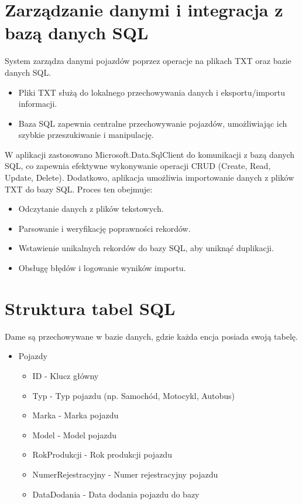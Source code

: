 \section{Zarządzanie danymi i integracja z bazą danych SQL}
System zarządza danymi pojazdów poprzez operacje na plikach TXT oraz bazie danych SQL.
\begin{itemize}
    \item Pliki TXT służą do lokalnego przechowywania danych i eksportu/importu informacji.
    \item Baza SQL zapewnia centralne przechowywanie pojazdów, umożliwiając ich szybkie przeszukiwanie i manipulację.
\end{itemize}
W aplikacji zastosowano Microsoft.Data.SqlClient do komunikacji z bazą danych SQL, co zapewnia efektywne wykonywanie operacji CRUD (Create, Read, Update, Delete).
Dodatkowo, aplikacja umożliwia importowanie danych z plików TXT do bazy SQL. Proces ten obejmuje:
\begin{itemize}
\item Odczytanie danych z plików tekstowych.
\item Parsowanie i weryfikację poprawności rekordów.
\item Wstawienie unikalnych rekordów do bazy SQL, aby uniknąć duplikacji.
\item Obsługę błędów i logowanie wyników importu.
\end{itemize}
\section{Struktura tabel SQL}
Dame są przechowywane w bazie danych, gdzie każda encja posiada swoją tabelę.
\begin{itemize}
\item Pojazdy
\begin{itemize}
\item ID - Klucz główny
\item Typ - Typ pojazdu (np. Samochód, Motocykl, Autobus)
\item Marka - Marka pojazdu
\item Model - Model pojazdu
\item RokProdukcji - Rok produkcji pojazdu
\item NumerRejestracyjny - Numer rejestracyjny pojazdu
\item DataDodania - Data dodania pojazdu do bazy
 \end{itemize}
\end{itemize}

